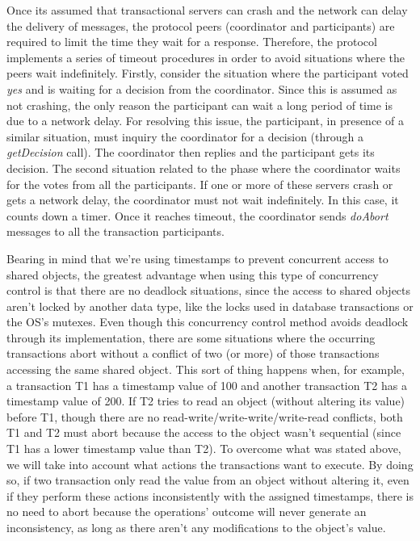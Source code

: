 \documentclass[times, 10pt,twocolumn]{article}
\begin{document}
Once its assumed that transactional servers can crash and the network can delay the delivery of messages, the protocol peers (coordinator and participants) are required to limit the time they wait for a response. Therefore, the protocol implements a series of timeout procedures in order to avoid situations where the peers wait indefinitely. 
Firstly, consider the situation where the participant voted \emph{yes} and is waiting for a decision from the coordinator. Since this is assumed as not crashing, the only reason the participant can wait a long period of time is due to a network delay. For resolving this issue, the participant, in presence of a similar situation, must inquiry the coordinator for a decision (through a \emph{getDecision} call). The coordinator then replies and the participant gets its decision.
The second situation related to the phase where the coordinator waits for the votes from all the participants. If one or more of these servers crash or gets a network delay, the coordinator must not wait indefinitely. In this case, it counts down a timer. Once it reaches timeout, the coordinator sends \emph{doAbort} messages to all the transaction participants.






Bearing in mind that we're using timestamps to prevent concurrent access to shared objects, the greatest advantage when using this type of concurrency control is that there are no deadlock situations, since the access to shared objects aren't locked by another data type, like the locks used in database transactions or the OS's mutexes.
Even though this concurrency control method avoids deadlock through its implementation, there are some situations where the occurring transactions abort without a conflict of two (or more) of those transactions accessing the same shared object. This sort of thing happens when, for example, a transaction T1 has a timestamp value of 100 and another transaction T2 has a timestamp value of 200. If T2 tries to read an object (without altering its value) before T1, though there are no read-write/write-write/write-read conflicts, both T1 and T2 must abort because the access to the object wasn't sequential (since T1 has a lower timestamp value than T2).
To overcome what was stated above, we will take into account what actions the transactions want to execute. By doing so, if two transaction only read the value from an object without altering it, even if they perform these actions inconsistently with the assigned timestamps, there is no need to abort because the operations' outcome will never generate an inconsistency, as long as there aren't any modifications to the object's value.





\end{document}
